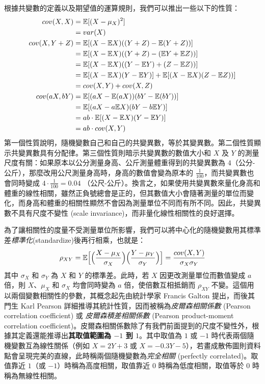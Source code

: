     根據共變數的定義以及期望值的運算規則，我們可以推出一些以下的性質：
    \allowdisplaybreaks
    \begin{align*}
        cov(X,X) &= \mathbb{E}[(X - \mu_X)^2] \\
        &= var(X)\\
        cov(X,Y+Z) &= \mathbb{E}[(X - \mathbb{E} X)((Y+Z) - \mathbb{E}(Y+Z))] \\
        &= \mathbb{E}[(X - \mathbb{E} X)((Y+Z) - (\mathbb{E} Y + \mathbb{E} Z))] \\
        &= \mathbb{E}[(X - \mathbb{E} X)((Y-\mathbb{E} Y) + (Z - \mathbb{E} Z))] \\
        &= \mathbb{E}[(X - \mathbb{E} X)(Y-\mathbb{E} Y)] + \mathbb{E}[(X - \mathbb{E} X)(Z - \mathbb{E} Z))]\\
        &= cov(X,Y) + cov(X,Z)\\
        cov(aX,bY) &= \mathbb{E}[(aX-\mathbb{E}(aX))(bY-\mathbb{E}(bY))]\\
        &= \mathbb{E}[(aX-a\mathbb{E} X)(bY-b \mathbb{E} Y)]\\
        &= ab \cdot \mathbb{E}[(X-\mathbb{E} X)(Y- \mathbb{E} Y)]\\
        &= ab \cdot cov(X,Y)
    \end{align*}
    第一個性質說明，隨機變數自己和自己的共變異數，等於其變異數。第二個性質顯示共變異數具有分配律。第三個性質則暗示共變異數的數值大小和 $X$ 及 $Y$ 的測量尺度有關：如果原本以公分測量身高、公斤測量體重得到的共變異數為 $4$（公分-公斤），那麼改用公尺測量身高時，身高的數值會變為原本的 $\frac{1}{100}$，而共變異數也會同時變成 $4 \cdot \frac{1}{100} = 0.04$ （公尺-公斤）。換言之，如果使用共變異數來量化身高和體重的線性相關，雖然正負號總會是正的，但其數值大小會隨著測量的單位而變化，而身高和體重的相關性顯然不會因為測量單位不同而有所不同。因此，共變異數不具有尺度不變性 (scale invariance)，而非量化線性相關性的良好選擇。

    為了讓相關性的度量不受測量單位所影響，我們可以將中心化的隨機變數用其標準差\textit{標準化}(standardize)後再行相乘，也就是：
    \[\rho_{XY} = \mathbb{E}\Big[\Big(\frac{X - \mu_X}{\sigma_X}\Big)\Big(\frac{Y - \mu_Y}{\sigma_Y}\Big)\Big] = \frac{cov(X,Y)}{\sigma_X \sigma_Y}\]
    其中 $\sigma_X$ 和 $\sigma_Y$ 為 $X$ 和 $Y$ 的標準差。此時，若 $X$ 因更改測量單位而數值變成 $a$ 倍，則 $X$、$\mu_X$ 和 $\sigma_X$ 均會同時變為 $a$ 倍，使倍數互相抵銷而 $\rho_{XY}$ 不變。這個用以兩個變數相關性的參數，其概念起先由統計學家 Francis Galton 提出，而後其門生 Karl Pearson 詳細推導其統計性質，因而被稱為\textit{皮爾森相關係數} (Pearson correlation coefficient) 或 \textit{皮爾森積差相關係數} (Pearson product-moment correlation coefficient)。皮爾森相關係數除了有我們前面提到的尺度不變性外，根據其定義還能推導出\textbf{其取值範圍為 $-1$ 到 $1$}。其中取值為 $1$ 或 $-1$ 時代表兩個隨機變數互為線性關係（例如 $X = 2Y+3$ 或 $X = -0.3Y-5$），若畫成散佈圖則資料點會呈現完美的直線，此時稱兩個隨機變數為\textit{完全相關} (perfectly correlated)。取值靠近 $1$（或 $-1$）時稱為高度相關，取值靠近 $0$ 時稱為低度相關，取值等於 $0$ 時稱為無線性相關。
    
